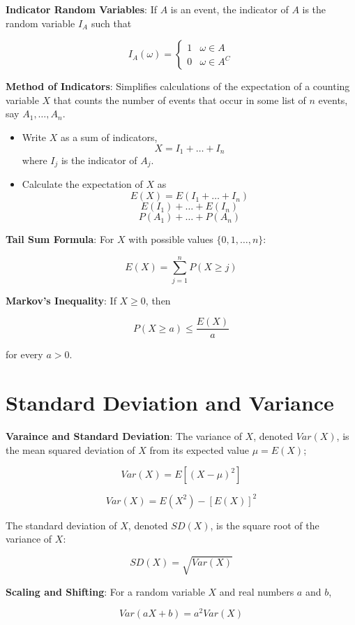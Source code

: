 \documentclass{article}
\begin{document}
\noindent\textbf{\color{blue}Indicator Random Variables}: If $A$ is an event, the indicator of $A$ is the random variable $I_A$ such that 

$$I_A(\omega)=\begin{cases}1&\omega\in A\\0&\omega\in A^C\end{cases}$$

\noindent\textbf{\color{orange}Method of Indicators}: Simplifies calculations of the expectation of a counting variable $X$ that counts the number of events that occur in some list of $n$ events, say $A_1,\ldots,A_n$.

\begin{itemize}
    \item Write $X$ as a sum of indicators,
    $$X=I_1+\ldots+I_n$$
    where $I_j$ is the indicator of $A_j$.
    \item Calculate the expectation of $X$ as
    $$E(X)=E(I_1+\ldots+I_n)$$
    $$E(I_1)+\ldots+E(I_n)$$
    $$P(A_1)+\ldots+P(A_n)$$
\end{itemize}

\noindent\textbf{\color{red}Tail Sum Formula}: For $X$ with possible values $\{0,1,\ldots,n\}$:

$$E(X)=\underset{j=1}{\overset{n}{\sum}}P(X\ge j)$$

\noindent\textbf{\color{red}Markov's Inequality}: If $X\ge0$, then

$$P(X\ge a)\le\frac{E(X)}{a}$$

for every $a>0$.

\section{Standard Deviation and Variance}

\noindent\textbf{\color{blue}Varaince and Standard Deviation}: The variance of $X$, denoted $Var(X)$, is the mean squared deviation of $X$ from its expected value $\mu=E(X)$;

$$Var(X)=E[(X-\mu)^2]$$

$$Var(X)=E(X^2)-[E(X)]^2$$

The standard deviation of $X$, denoted $SD(X)$, is the square root of the variance of $X$:

$$SD(X)=\sqrt{Var(X)}$$

\noindent\textbf{\color{red}Scaling and Shifting}: For a random variable $X$ and real numbers $a$ and $b$,

$$Var(aX+b)=a^2Var(X)$$
 
\end{document}
